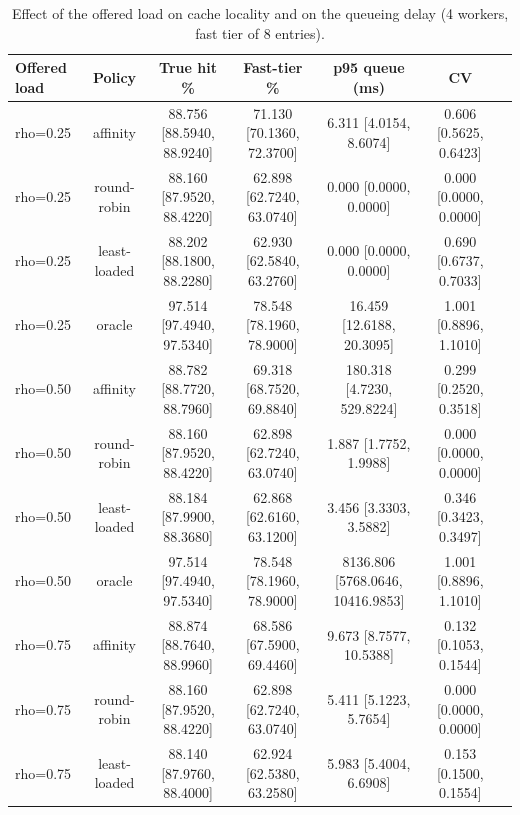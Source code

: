 \begin{table}[t]
\centering
\scriptsize
\setlength{\tabcolsep}{2.5pt}
\caption{Effect of the offered load on cache locality and on the queueing delay (4 workers, fast tier of 8 entries).}
\label{tab:saturation}
\begin{tabular}{lcccccc}
\toprule
Offered load & Policy & True hit \% & Fast-tier \% & p95 queue (ms) & CV \\
\midrule
rho=0.25 & affinity & 88.756 \tiny [88.5940, 88.9240] & 71.130 \tiny [70.1360, 72.3700] & 6.311 \tiny [4.0154, 8.6074] & 0.606 \tiny [0.5625, 0.6423] \\
rho=0.25 & round-robin & 88.160 \tiny [87.9520, 88.4220] & 62.898 \tiny [62.7240, 63.0740] & 0.000 \tiny [0.0000, 0.0000] & 0.000 \tiny [0.0000, 0.0000] \\
rho=0.25 & least-loaded & 88.202 \tiny [88.1800, 88.2280] & 62.930 \tiny [62.5840, 63.2760] & 0.000 \tiny [0.0000, 0.0000] & 0.690 \tiny [0.6737, 0.7033] \\
rho=0.25 & oracle & 97.514 \tiny [97.4940, 97.5340] & 78.548 \tiny [78.1960, 78.9000] & 16.459 \tiny [12.6188, 20.3095] & 1.001 \tiny [0.8896, 1.1010] \\
rho=0.50 & affinity & 88.782 \tiny [88.7720, 88.7960] & 69.318 \tiny [68.7520, 69.8840] & 180.318 \tiny [4.7230, 529.8224] & 0.299 \tiny [0.2520, 0.3518] \\
rho=0.50 & round-robin & 88.160 \tiny [87.9520, 88.4220] & 62.898 \tiny [62.7240, 63.0740] & 1.887 \tiny [1.7752, 1.9988] & 0.000 \tiny [0.0000, 0.0000] \\
rho=0.50 & least-loaded & 88.184 \tiny [87.9900, 88.3680] & 62.868 \tiny [62.6160, 63.1200] & 3.456 \tiny [3.3303, 3.5882] & 0.346 \tiny [0.3423, 0.3497] \\
rho=0.50 & oracle & 97.514 \tiny [97.4940, 97.5340] & 78.548 \tiny [78.1960, 78.9000] & 8136.806 \tiny [5768.0646, 10416.9853] & 1.001 \tiny [0.8896, 1.1010] \\
rho=0.75 & affinity & 88.874 \tiny [88.7640, 88.9960] & 68.586 \tiny [67.5900, 69.4460] & 9.673 \tiny [8.7577, 10.5388] & 0.132 \tiny [0.1053, 0.1544] \\
rho=0.75 & round-robin & 88.160 \tiny [87.9520, 88.4220] & 62.898 \tiny [62.7240, 63.0740] & 5.411 \tiny [5.1223, 5.7654] & 0.000 \tiny [0.0000, 0.0000] \\
rho=0.75 & least-loaded & 88.140 \tiny [87.9760, 88.4000] & 62.924 \tiny [62.5380, 63.2580] & 5.983 \tiny [5.4004, 6.6908] & 0.153 \tiny [0.1500, 0.1554] \\

\end{tabular}
\end{table}
